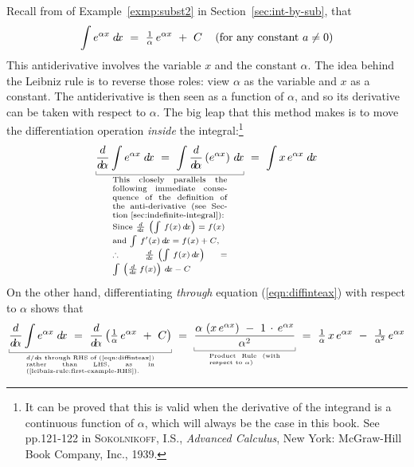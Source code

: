 Recall from  of Example~\ref{exmp:subst2} in Section~\ref{sec:int-by-sub}, that
\begin{equation}
\int e^{\alpha x}\;d\!x ~=~ \tfrac{1}{\alpha}\,e^{\alpha x} ~+~ C\quad\left(\text{for any constant $a \ne 0$}\right)\label{eqn:diffinteax}
\end{equation}
This antiderivative involves the variable $x$
and the constant $\alpha$. The idea behind the Leibniz rule is to reverse those
roles: view $\alpha$ as the variable and $x$ as a constant. The antiderivative
is then seen as a function of $\alpha$, and so its derivative can be taken with
respect to $\alpha$. The big leap that this method makes is to move the
differentiation operation \emph{inside} the integral:\footnote{It can be proved
that this is valid when the derivative of the integrand is a continuous function
of $\alpha$, which will always be the case in this book. See pp.121-122 in
\textsc{Sokolnikoff, I.S.}, \emph{Advanced Calculus}, New York: McGraw-Hill Book
Company, Inc., 1939.}
\begin{equation}\label{leibniz-rule:first-example-RHS}
\underbracket[0.3pt]{
\frac{d}{\dalpha} \int e^{\alpha x}\;\dx ~=~
\int \frac{d}{\dalpha}\,(e^{\alpha x})~\dx
}_{\begin{minipage}[t]{0.3\linewidth}
    \scriptsize
    This closely parallels the following immediate consequence of the
    definition of the anti-derivative (see
    Section~\ref{sec:indefinite-integral}):\\
    Since $\ddx\,\left(\int\,f(x)\,\dx\right) = f(x)$\\
    and $\int\,f'(x)\,\dx = f(x) + C$,\\
    $\therefore~\ddx\,\left(\int\,f(x)\,\dx\right) = \int\,\left(\frac{d}{\dx}\,f(x)\right)\,\dx - C$
\end{minipage}}
~=~ \int x\,e^{\alpha x}\;\dx
\end{equation}
On the other hand, differentiating \emph{through} equation
(\ref{eqn:diffinteax}) with respect to $\alpha$ shows that
\begin{equation}\label{leibniz-rule:first-example-LHS}
\underbracket[0.3pt]{
\frac{d}{\dalpha} \int e^{\alpha x}\;\dx ~=~
\frac{d}{\dalpha} \left(\tfrac{1}{\alpha}\,e^{\alpha x} ~+~ C\right)
}_{\begin{minipage}[t]{0.335\linewidth}
    \tiny
    $d/\dalpha$ through RHS of (\ref{eqn:diffinteax}) rather than LHS,
    as in (\ref{leibniz-rule:first-example-RHS}).
\end{minipage}}
~=~
\underbracket[0.3pt]{
  \frac{\alpha\,\left(x\,e^{\alpha x}\right) ~-~ 1\,\cdot\,e^{\alpha x}}{\alpha^2}
}_{\begin{minipage}[t]{0.185\linewidth}\tiny Product Rule (with respect to $\alpha$)\end{minipage}}
~=~
\tfrac{1}{\alpha}\,x\,e^{\alpha x} ~-~ \tfrac{1}{\alpha^2}\,e^{\alpha x}
\end{equation}
